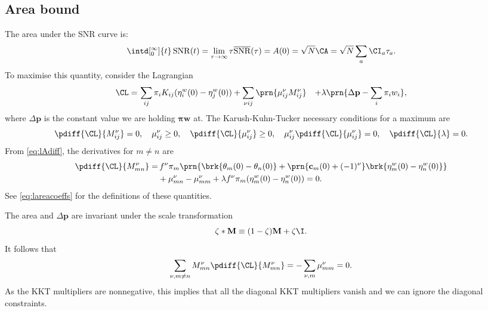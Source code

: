 \documentclass[12pt]{article}
\newcommand{\prm}{p}
\newcommand{\pr}{\mathbf{\prm}}
\newcommand{\eqm}{\pi}
\newcommand{\eq}{\boldsymbol{\eqm}}
\newcommand{\etwm}{\eta^w}
\newcommand{\thbm}{\theta}
\newcommand{\wm}{w}
\newcommand{\w}{\mathbf{\wm}}
\newcommand{\MMdm}{M}
\newcommand{\MMd}{\mathbf{\MMdm}}
\newcommand{\encm}{K}
\DeclareMathOperator{\snr}{SNR}
\newcommand{\snrb}{\overline{\snr}}
\begin{document}

\subsection{Area bound}\label{sec:area}

The area under the SNR curve is:
%
\begin{equation}\label{eq:areadef}
  \intd[_0^\infty]{t} \snr(t) = \lim_{\tau\to\infty} \tau \snrb(\tau) 
      = A(0) = \sqrt{N} \CA = \sqrt{N} \sum_a \CI_a \tau_a.
\end{equation}
%
To maximise this quantity, consider the Lagrangian
%
\begin{equation}\label{eq:arealagrangian}
\begin{aligned}
  \CL =&\, \sum_{ij} \eqm_i \encm_{ij} (\etwm_i(0) - \etwm_j(0))
        +\sum_{\nu i j} \prn{ \mu^\nu_{ij} \MMdm^\nu_{ij} }
        &+ \lambda \prn{ \Delta\pr - \sum_i \eqm_i \wm_i },
\end{aligned}
\end{equation}
%
where \(\Delta\pr\) is the constant value we are holding \(\eq\w\) at.
The Karush-Kuhn-Tucker necessary conditions for a maximum are
%
\begin{equation}\label{eq:KTarea}
  \pdiff{\CL}{\MMdm^\nu_{ij}} = 0, \quad
  \mu^\nu_{ij} \geq 0, \quad
  \pdiff{\CL}{\mu^\nu_{ij}} \geq 0, \quad
  \mu^\nu_{ij}\pdiff{\CL}{\mu^\nu_{ij}} = 0, \quad
  \pdiff{\CL}{\lambda} = 0.
\end{equation}
%
From \cref{eq:lAdiff}, the derivatives for \(m \neq n\) are
%
\begin{equation}\label{eq:areaderivs}
\begin{aligned}
  \pdiff{\CL}{\MMdm^\nu_{mn}} = & \,
    f^\nu \eqm_m \prn{ \brk{\thbm_m(0) - \thbm_n(0)}
     + \prn{\mathbf{c}_m(0) + (-1)^\nu} \brk{\etwm_m(0) - \etwm_n(0)} } \\
     &+ \mu^\nu_{mn} -  \mu^\nu_{mm}
     + \lambda f^\nu \eqm_m (\etwm_{m}(0)-\etwm_{n}(0)) 
    = 0.
\end{aligned}
\end{equation}
%
See \cref{eq:lareacoeffs} for the definitions of these quantities.

The area and \(\Delta\pr\) are invariant under the scale transformation %
%
\begin{equation}\label{eq:scale}
  \zeta * \MMd \equiv (1-\zeta) \MMd + \zeta \I .
\end{equation}
%
It follows that
%
\begin{equation*}
  \sum_{\nu, m \neq n} \MMdm^\nu_{mn} \pdiff{\CL}{\MMdm^\nu_{mn}} 
    = - \sum_{\nu, m} \mu^\nu_{mm} = 0 .
\end{equation*}
%
As the KKT multipliers are nonnegative, this implies that all the diagonal KKT multipliers vanish and we can ignore the diagonal constraints.
\end{document}
